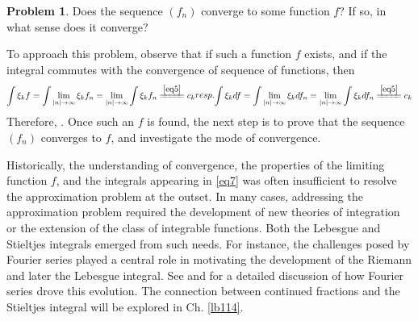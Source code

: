 \documentclass[12pt,b5paper,notitlepage]{article}
\theoremstyle{definition}
\newtheorem{problem}[df]{Problem}
\theoremstyle{plain}
\numberwithin{equation}{section}
\begin{document}
\begin{problem}\label{lb18}
Does the sequence $(f_n)$ converge to some function $f$? If so, in what sense does it converge? 
\end{problem}

To approach this problem, observe that if such a function $f$ exists, and if the integral commutes with the convergence of sequence of functions, then
\begin{subequations}\label{eq7}
\begin{align}
\int \xi_k f=\int\lim_{|n|\rightarrow\infty}\xi_kf_n=\lim_{|n|\rightarrow\infty}\int \xi_kf_n\xlongequal{\eqref{eq5}}c_k
\end{align}
resp.
\begin{align}\label{eq7b}
\int \xi_k df=\int\lim_{|n|\rightarrow\infty}\xi_kdf_n=\lim_{|n|\rightarrow\infty}\int \xi_kdf_n\xlongequal{\eqref{eq5}}c_k
\end{align}
\end{subequations}
Therefore, . Once such an $f$ is found, the next step is to prove that the sequence $(f_n)$ converges to $f$, and investigate the mode of convergence.


Historically, the understanding of convergence, the properties of the limiting function $f$, and the integrals appearing in \eqref{eq7} was often insufficient to resolve the approximation problem at the outset. In many cases, addressing the approximation problem required the development of new theories of integration or the extension of the class of integrable functions. Both the Lebesgue and Stieltjes integrals emerged from such needs. For instance, the challenges posed by Fourier series played a central role in motivating the development of the Riemann and later the Lebesgue integral. See \cite[Ch. 6, 9]{Jah} and \cite{Haw-L} for a detailed discussion of how Fourier series drove this evolution. The connection between continued fractions and the Stieltjes integral will be explored in Ch. \ref{lb114}. 
\end{document}
